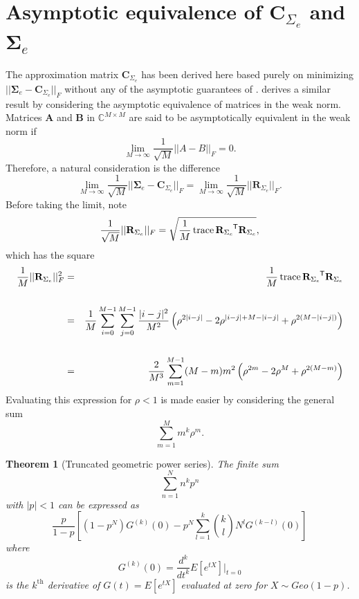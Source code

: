 \documentclass[letterpaper,12pt,oneside,final]{article}
\newtheorem{theorem}{Theorem}
\newcommand{\m}[1]{\mathbf{#1}}               %
\newcommand{\sm}[1]{\boldsymbol{#1}}   %
\newcommand{\tr}[1]{{#1}^{\mkern-1.5mu\mathsf{T}}}              %
\newcommand{\norm}[1]{||{#1}||}              %
\newcommand{\frob}[1]{\norm{#1}_F}
\newcommand{\abs}[1]{\lvert{#1}\rvert}              %
\newcommand*{\trace}{\operatorname{trace}}
\newcommand{\field}[1]{\mathbb{#1}}
\newcommand{\Complex}{\field{C}}
\begin{document}
\section{Asymptotic equivalence of $\m{C}_{\Sigma_e}$ and $\m{\Sigma}_e$} \label{c:multipleTesting:asympEquiv}

The approximation matrix $\m{C}_{\Sigma_e}$ has been derived here based purely on minimizing $\frob{\sm{\Sigma}_e - \m{C}_{\Sigma_e}}$ without any of the asymptotic guarantees of \cite{grenanderszego1958}. \cite{gray2006toeplitz} derives a similar result by considering the asymptotic equivalence of matrices in the weak norm. Matrices $\m{A}$ and $\m{B}$ in $\Complex^{M \times M}$ are said to be asymptotically equivalent in the weak norm if
$$\lim_{M \rightarrow \infty} \frac{1}{\sqrt{M}} \frob{A - B} = 0.$$
Therefore, a natural consideration is the difference
\begin{equation} \label{eq:multipleTesting:asympEq}
  \lim_{M \rightarrow \infty} \frac{1}{\sqrt{M}} \frob{\sm{\Sigma}_e - \m{C}_{\Sigma_e}} = \lim_{M \rightarrow \infty} \frac{1}{\sqrt{M}} \frob{\m{R}_{\Sigma_e}}.
\end{equation}
Before taking the limit, note
$$\frac{1}{\sqrt{M}} \frob{\m{R}_{\Sigma_e}} =  \sqrt{ \frac{1}{M} \trace{\tr{\m{R}_{\Sigma_e}} \m{R}_{\Sigma_e}} },$$
which has the square
\begin{eqnarray}
    \frac{1}{M} \frob{\m{R}_{\Sigma_e}}^2 & = &  \frac{1}{M} \trace{\tr{\m{R}_{\Sigma_e}} \m{R}_{\Sigma_e}} \nonumber \\
    & & \nonumber \\
    & = & \frac{1}{M} \sum_{i = 0}^{M-1} \sum_{j = 0}^{M-1} \frac{\abs{i-j}^2}{M^2} \left ( \rho^{2\abs{i-j}} - 2 \rho^{\abs{i-j} + M - \abs{i-j}} + \rho^{2(M - \abs{i-j})} \right ) \nonumber \\
    & & \nonumber \\
    & = & \frac{2}{M^3} \sum_{m = 1}^{M-1} (M-m) m^2 \left ( \rho^{2m} - 2 \rho^{M} + \rho^{2(M - m)} \right ) \label{eq:asymTrace}
\end{eqnarray}
Evaluating this expression for $\rho < 1$ is made easier by considering the general sum
$$\sum_{m = 1}^{M} m^k \rho^m.$$
\begin{theorem}[Truncated geometric power series] \label{thm:trunkmoment}
  The finite sum
  $$\sum_{n = 1}^{N} n^k p^n$$
  with $\abs{p} < 1$ can be expressed as
  $$\frac{p}{1 - p} \left [ (1 - p^N) G^{(k)}(0) - p^{N} \sum_{l = 1}^k {k \choose l} N^l G^{(k-l)}(0) \right ]$$
  where
  $$G^{(k)}(0) = \frac{d^k}{dt^k} E[e^{tX}] \Big |_{t = 0}$$
  is the $k^{\text{th}}$ derivative of $G(t) = E[e^{tX}]$ evaluated at zero for $X \sim Geo(1 - p)$.
\end{theorem}
\end{document}
